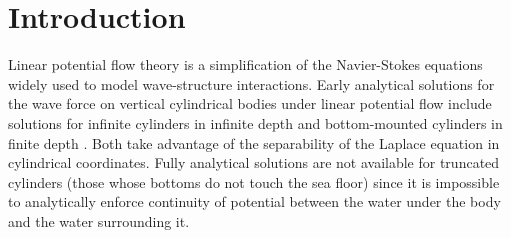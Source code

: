\documentclass[lineno]{JFM-FLM_Au}
\begin{document}
\section{Introduction}
\label{jfm:sec:Introduction}
Linear potential flow theory is a simplification of the Navier-Stokes equations widely used to model wave-structure interactions.
Early analytical solutions for the wave force on vertical cylindrical bodies under linear potential flow include solutions for infinite cylinders in infinite depth \citep{havelock_forces_1936} and bottom-mounted cylinders in finite depth \citep{fuchs_wave_1954}.
Both take advantage of the separability of the Laplace equation in cylindrical coordinates.
Fully analytical solutions are not available for truncated cylinders (those whose bottoms do not touch the sea floor) since it is impossible to analytically enforce continuity of potential between the water under the body and the water surrounding it.
\end{document}
